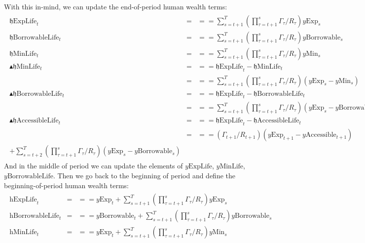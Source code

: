 \documentclass[titlepage,abstract]{\econtex}
\providecommand{\hExpLife}{\mathrm{h}\text{ExpLife}}
\providecommand{\hMinLife}{\mathrm{h}\text{MinLife}}
\providecommand{\hBorrowableLife}{\mathrm{h}\text{BorrowableLife}}
\providecommand{\hEndExpLife}{\mathfrak{h}\text{ExpLife}}
\providecommand{\hEndMinLife}{\mathfrak{h}\text{MinLife}}
\providecommand{\hEndBorrowableLife}{\mathfrak{h}\text{BorrowableLife}}
\providecommand{\hEndAccessibleLife}{\mathfrak{h}\text{AccessibleLife}}
\providecommand{\DeltahEndMinLife}{\blacktriangle \mathfrak{h}\text{MinLife}}
\providecommand{\DeltahEndBorrowableLife}{\blacktriangle \mathfrak{h}\text{BorrowableLife}}
\providecommand{\DeltahEndAccessibleLife}{\blacktriangle \mathfrak{h}\text{AccessibleLife}}
\providecommand{\yMinLife}{y\text{MinLife}}
\providecommand{\yBorrowableLife}{y\text{BorrowableLife}}
\providecommand{\yExpLife}{y\text{ExpLife}}
\providecommand{\yMin}{y\text{Min}}
\providecommand{\yBorrowable}{y\text{Borrowable}}
\providecommand{\yAccessible}{y\text{Accessible}}
\providecommand{\yExp}{y\text{Exp}}
\begin{document}
With this in-mind, we can update the end-of-period human wealth terms:
\begin{equation}\begin{gathered}\begin{aligned}
          \hEndExpLife_{t}   &=& =  =  \sum_{s=t+1}^{T} (\prod_{\tau=t+1}^{s}\Gamma_{\tau} /R_{\tau}) \yExp_{s} \\
          \hEndBorrowableLife_{t}   &=& =  =  \sum_{s=t+1}^{T} (\prod_{\tau=t+1}^{s}\Gamma_{\tau}/R_{\tau}) \yBorrowable_{s} \\
          \hEndMinLife_{t}   &=& =  =  \sum_{s=t+1}^{T} (\prod_{\tau=t+1}^{s}\Gamma_{\tau}/R_{\tau}) \yMin_{s} \\
          \DeltahEndMinLife_{t}   &=& =  =  \hEndExpLife_{t} -  \hEndMinLife_{t}\\
                            &=& =  =  \sum_{s=t+1}^{T} (\prod_{\tau=t+1}^{s}\Gamma_{\tau}/R_{\tau}) (\yExp_{s}-\yMin_{s}) \\
          \DeltahEndBorrowableLife_{t}   &=& =  =  \hEndExpLife_{t} -  \hEndBorrowableLife_{t}\\
                            &=& =  =  \sum_{s=t+1}^{T} (\prod_{\tau=t+1}^{s}\Gamma_{\tau}/R_{\tau}) (\yExp_{s}-\yBorrowable_{s}) \\
          \DeltahEndAccessibleLife_{t}   &=& =  =  \hEndExpLife_{t} -  \hEndAccessibleLife_{t}\\
                            &=& =  =  (\Gamma_{t+1}/R_{t+1}) (\yExp_{t+1}-\yAccessible_{t+1}) \\
                            +\sum_{s=t+2}^{T} (\prod_{\tau=t+1}^{s}\Gamma_{\tau}/R_{\tau}) (\yExp_{s}-\yBorrowable_{s})
\end{aligned}\end{gathered}\end{equation}
And in the middle of period we can update the elements of $\yExpLife$, $\yMinLife$, $\yBorrowableLife$. Then we go back to the beginning of period and define the beginning-of-period human wealth terms:
\begin{equation}\begin{gathered}\begin{aligned}
          \hExpLife_{t}   &=& =  =  \yExp_{t} + \sum_{s=t+1}^{T} (\prod_{\tau=t+1}^{s}\Gamma_{\tau} /R_{\tau}) \yExp_{s} \\
          \hBorrowableLife_{t}   &=& =  =  \yBorrowable_{t} + \sum_{s=t+1}^{T} (\prod_{\tau=t+1}^{s}\Gamma_{\tau}/R_{\tau}) \yBorrowable_{s} \\
          \hMinLife_{t}   &=& =  =  \yExp_{t} +\sum_{s=t+1}^{T} (\prod_{\tau=t+1}^{s}\Gamma_{\tau}/R_{\tau}) \yMin_{s}
\end{aligned}\end{gathered}\end{equation}
\end{document}
